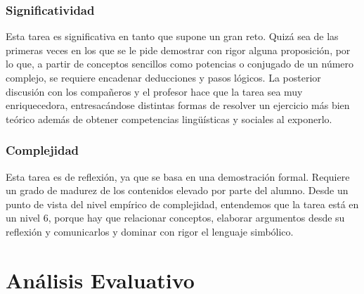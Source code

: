 \documentclass[../main.tex]{memoir}
\begin{document}
\subsubsection{Significatividad}
Esta tarea es significativa en tanto que supone un gran reto. Quizá sea de las primeras veces en los que se le pide demostrar con rigor alguna proposición, por lo que, a partir de conceptos sencillos como potencias o conjugado de un número complejo, se requiere encadenar deducciones y pasos lógicos. La posterior discusión con los compañeros y el profesor hace que la tarea sea muy enriquecedora, entresacándose distintas formas de resolver un ejercicio más bien teórico además de obtener competencias lingüísticas y sociales al exponerlo.

\subsubsection{Complejidad}
Esta tarea es de reflexión, ya que se basa en una demostración formal. Requiere un grado de madurez de los contenidos elevado por parte del alumno. Desde un punto de vista del nivel empírico de complejidad, entendemos que la tarea está en un nivel 6, porque hay que relacionar conceptos, elaborar argumentos desde su reflexión y comunicarlos y dominar con rigor el lenguaje simbólico. 


\section{Análisis Evaluativo}
\end{document}
